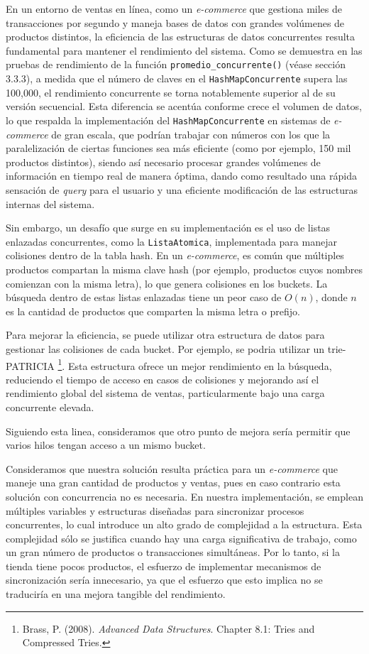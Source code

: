 \documentclass[a4paper]{article}
\begin{document}
    En un entorno de ventas en línea, como un \textit{e-commerce} que gestiona miles de transacciones por segundo y maneja bases de datos con grandes volúmenes de productos distintos, la eficiencia de las estructuras de datos concurrentes resulta fundamental para mantener el rendimiento del sistema. Como se demuestra en las pruebas de rendimiento de la función \texttt{promedio\_concurrente()} (véase sección 3.3.3), a medida que el número de claves en el \texttt{HashMapConcurrente} supera las 100,000, el rendimiento concurrente se torna notablemente superior al de su versión secuencial. Esta diferencia se acentúa conforme crece el volumen de datos, lo que respalda la implementación del \texttt{HashMapConcurrente} en sistemas de \textit{e-commerce} de gran escala, que podrían trabajar con números con los que la paralelización de ciertas funciones sea más eficiente (como por ejemplo, 150 mil productos distintos), siendo así necesario procesar grandes volúmenes de información en tiempo real de manera óptima, dando como resultado una rápida sensación de \textit{query} para el usuario y una eficiente modificación de las estructuras internas del sistema.

    Sin embargo, un desafío que surge en su implementación es el uso de listas enlazadas concurrentes, como la \texttt{ListaAtomica}, implementada para manejar colisiones dentro de la tabla hash. En un \textit{e-commerce}, es común que múltiples productos compartan la misma clave hash (por ejemplo, productos cuyos nombres comienzan con la misma letra), lo que genera colisiones en los buckets. La búsqueda dentro de estas listas enlazadas tiene un peor caso de $O(n)$, donde $n$ es la cantidad de productos que comparten la misma letra o prefijo.

    Para mejorar la eficiencia, se puede utilizar otra estructura de datos para gestionar las colisiones de cada bucket. Por ejemplo, se podria utilizar un trie-PATRICIA
    \footnote{Brass, P. (2008). \textit{Advanced Data Structures}. Chapter 8.1: Tries and Compressed Tries.\label{fnlabel}}.
    Esta estructura ofrece un mejor rendimiento en la búsqueda, reduciendo el tiempo de acceso en casos de colisiones y mejorando así el rendimiento global del sistema de ventas, particularmente bajo una carga concurrente elevada.

    Siguiendo esta linea, consideramos que otro punto de mejora sería permitir que varios hilos tengan acceso a un mismo bucket.

    Consideramos que nuestra solución resulta práctica para un \textit{e-commerce} que maneje una gran cantidad de productos y ventas, pues en caso contrario esta solución con concurrencia no es necesaria. En nuestra implementación, se emplean múltiples variables y estructuras diseñadas para sincronizar procesos concurrentes, lo cual introduce un alto grado de complejidad a la estructura. Esta complejidad sólo se justifica cuando hay una carga significativa de trabajo, como un gran número de productos o transacciones simultáneas. Por lo tanto, si la tienda tiene pocos productos, el esfuerzo de implementar mecanismos de sincronización sería innecesario, ya que el esfuerzo que esto implica no se traduciría en una mejora tangible del rendimiento.
\end{document}
